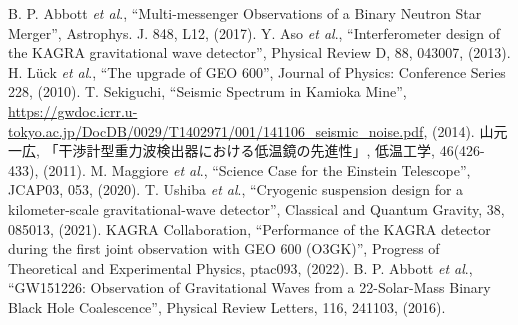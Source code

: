  B. P. Abbott \textit{et al}., ``Multi-messenger Observations of a Binary Neutron Star Merger'', Astrophys. J. 848, L12, (2017).
\vspace{2mm}
 Y. Aso \textit{et al}., ``Interferometer design of the KAGRA gravitational wave detector'', Physical Review D, 88, 043007, (2013).
\vspace{2mm}
  H. L\"{u}ck \textit{et al}., ``The upgrade of GEO 600'', Journal of Physics: Conference Series 228, (2010).
\vspace{2mm}
 T. Sekiguchi, ``Seismic Spectrum in Kamioka Mine'',\\\href{https://gwdoc.icrr.u-tokyo.ac.jp/DocDB/0029/T1402971/001/141106_seismic_noise.pdf}{https://gwdoc.icrr.u-tokyo.ac.jp/DocDB/0029/T1402971/001/141106\_seismic\_noise.pdf}, (2014).
\vspace{2mm}
 山元一広, 「干渉計型重力波検出器における低温鏡の先進性」, 低温工学, 46(426-433), (2011).
\vspace{2mm}
 M. Maggiore \textit{et al}., ``Science Case for the Einstein Telescope'', JCAP03, 053, (2020).
\vspace{2mm}
 T. Ushiba \textit{et al}., ``Cryogenic suspension design for a kilometer-scale gravitational-wave detector'', Classical and Quantum Gravity, 38, 085013, (2021).
\vspace{2mm}
 KAGRA Collaboration, ``Performance of the KAGRA detector during the first joint observation with GEO 600 (O3GK)'', Progress of Theoretical and Experimental Physics, ptac093, (2022).
\vspace{2mm}
 B. P. Abbott \textit{et al}., ``GW151226: Observation of Gravitational Waves from a 22-Solar-Mass Binary Black Hole Coalescence'', Physical Review Letters, 116, 241103, (2016).

